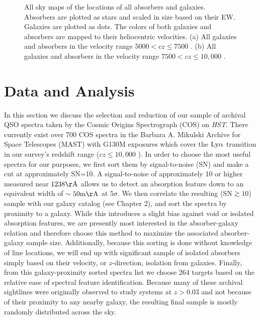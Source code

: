 \begin{figure}[ht!]
\centering
  \label{allsky_7500}
  \label{allsky_10000}
  \caption{\small{All sky maps of the locations of all absorbers and galaxies. Absorbers are plotted as stars and scaled in size based on their EW. Galaxies are plotted as dots. The colors of both galaxies and absorbers are mapped to their heliocentric velocities. (a) All galaxies and absorbers in the velocity range $5000 < cz \leq 7500$ \kms. (b) All galaxies and absorbers in the velocity range $7500 < cz \leq 10,000$ \kms.}}
\label{allsky_7500-10000}
\end{figure}

\section{Data and Analysis}

In this section we discuss the selection and reduction of our sample of archival QSO spectra taken by the Cosmic Origins Spectrograph (COS) on \textit{HST}. There currently exist over 700 COS spectra in the Barbara A. Mikulski Archive for Space Telescopes (MAST) with G130M exposures which cover the $\rm Ly\alpha$ transition in our survey's redshift range ($cz \leq 10,000$ \kms). In order to choose the most useful spectra for our purposes, we first sort them by signal-to-noise (SN) and make a cut at approximately SN=10. A signal-to-noise of approximately 10 or higher measured near $\rm 1238 \AA$ allows us to detect an absorption feature down to an equivalent width of $\rm \sim 50 m\AA$ at $5\sigma$. We then correlate the resulting (SN$\gtrsim 10$) sample with our galaxy catalog (see Chapter 2), and sort the spectra by proximity to a galaxy. While this introduces a slight bias against void or isolated absorption features, we are presently most interested in the absorber-galaxy relation and therefore choose this method to maximize the associated absorber-galaxy sample size. Additionally, because this sorting is done without knowledge of line locations, we will end up with significant sample of isolated absorbers simply based on their velocity, or $z$-direction, isolation from galaxies. Finally, from this galaxy-proximity sorted spectra list we choose 264 targets based on the relative ease of spectral feature identification. Because many of these archival sightlines were originally observed to study systems at $z > 0.03$ and not because of their proximity to any nearby galaxy, the resulting final sample is mostly randomly distributed across the sky.


